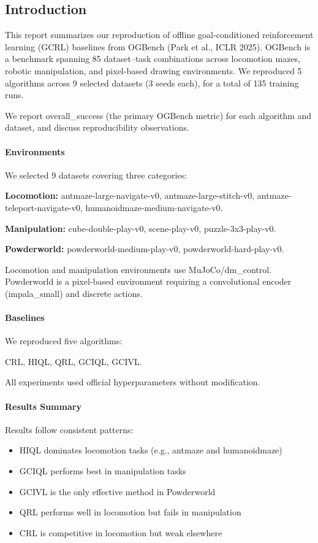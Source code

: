 \documentclass[11pt]{article}
\begin{document}
\subsection*{Introduction}

This report summarizes our reproduction of offline goal-conditioned reinforcement
learning (GCRL) baselines from OGBench (Park et al., ICLR 2025). OGBench is a
benchmark spanning 85 dataset--task combinations across locomotion mazes, robotic
manipulation, and pixel-based drawing environments. We reproduced 5 algorithms
across 9 selected datasets (3 seeds each), for a total of 135 training runs.

We report overall\_success (the primary OGBench metric) for each algorithm and
dataset, and discuss reproducibility observations.

\paragraph{Environments}

We selected 9 datasets covering three categories:

\textbf{Locomotion:}
antmaze-large-navigate-v0,
antmaze-large-stitch-v0,
antmaze-teleport-navigate-v0,
humanoidmaze-medium-navigate-v0.

\textbf{Manipulation:}
cube-double-play-v0,
scene-play-v0,
puzzle-3x3-play-v0.

\textbf{Powderworld:}
powderworld-medium-play-v0,
powderworld-hard-play-v0.

Locomotion and manipulation environments use MuJoCo/dm\_control. Powderworld is a
pixel-based environment requiring a convolutional encoder (impala\_small) and
discrete actions.

\paragraph{Baselines}

We reproduced five algorithms:

CRL, HIQL, QRL, GCIQL, GCIVL.

All experiments used official hyperparameters without modification.

\paragraph{Results Summary}

Results follow consistent patterns:

\begin{itemize}
\item HIQL dominates locomotion tasks (e.g., antmaze and humanoidmaze)
\item GCIQL performs best in manipulation tasks
\item GCIVL is the only effective method in Powderworld
\item QRL performs well in locomotion but fails in manipulation
\item CRL is competitive in locomotion but weak elsewhere
\end{itemize}
\end{document}

